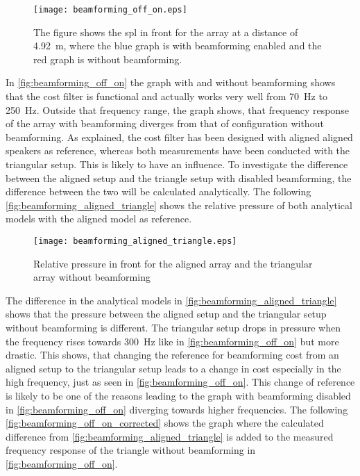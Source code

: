   \begin{figure}[H]
	\centering
	\texttt{[image: beamforming\_off\_on.eps]}
	\caption{The figure shows the \gls{spl} in front for the array at a distance of \SI{4.92}{\meter}, where the blue graph is with beamforming enabled and the red graph is without beamforming.}
		\label{fig:beamforming_off_on}
\end{figure}


In \autoref{fig:beamforming_off_on} the graph with and without beamforming shows that the cost filter is functional and actually works very well from \SI{70}{\hertz} to \SI{250}{\hertz}. Outside that frequency range, the graph shows, that frequency response of the array with beamforming diverges from that of configuration without beamforming. As explained, the cost filter has been designed with aligned aligned speakers as reference, whereas both measurements have been conducted with the triangular setup. This is likely to have an influence. To investigate the difference between the aligned setup and the triangle setup with disabled beamforming, the difference between the two will be calculated analytically. The following \autoref{fig:beamforming_aligned_triangle} shows the relative pressure of both analytical models with the aligned model as reference.

  \begin{figure}[H]
	\centering
	\texttt{[image: beamforming\_aligned\_triangle.eps]}
	\caption{Relative pressure in front for the aligned array and the triangular array without beamforming}
		\label{fig:beamforming_aligned_triangle}
\end{figure}

The difference in the analytical models in \autoref{fig:beamforming_aligned_triangle} shows that the pressure between the aligned setup and the triangular setup without beamforming is different. The triangular setup drops in pressure when the frequency rises towards \SI{300}{\hertz} like in \autoref{fig:beamforming_off_on} but more drastic. This shows, that changing the reference for beamforming cost from an aligned setup to the triangular setup leads to a change in cost especially in the high frequency, just as seen in \autoref{fig:beamforming_off_on}. This change of reference is likely to be one of the reasons leading to the graph with beamforming disabled in \autoref{fig:beamforming_off_on} diverging towards higher frequencies. The following \autoref{fig:beamforming_off_on_corrected} shows the graph where the calculated difference from \autoref{fig:beamforming_aligned_triangle} is added to the measured frequency response of the triangle without beamforming in  \autoref{fig:beamforming_off_on}.

